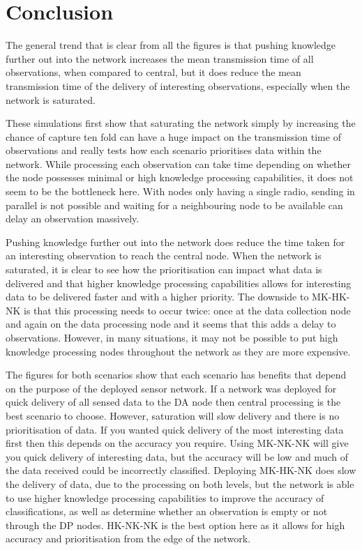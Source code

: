 \section{Conclusion}\label{sim:conc}
The general trend that is clear from all the figures is that pushing knowledge further out into the network increases the mean transmission time of all observations, when compared to central, but it does reduce the mean transmission time of the delivery of interesting observations, especially when the network is saturated.

These simulations first show that saturating the network simply by increasing the chance of capture ten fold can have a huge impact on the transmission time of observations and really tests how each scenario prioritises data within the network. While processing each observation can take time depending on whether the node possesses minimal or high knowledge processing capabilities, it does not seem to be the bottleneck here. With nodes only having a single radio, sending in parallel is not possible and waiting for a neighbouring node to be available can delay an observation massively.

Pushing knowledge further out into the network does reduce the time taken for an interesting observation to reach the central node. When the network is saturated, it is clear to see how the prioritisation can impact what data is delivered and that higher knowledge processing capabilities allows for interesting data to be delivered faster and with a higher priority. The downside to MK-HK-NK is that this processing needs to occur twice: once at the data collection node and again on the data processing node and it seems that this adds a delay to observations. However, in many situations, it may not be possible to put high knowledge processing nodes throughout the network as they are more expensive.

The figures for both scenarios show that each scenario has benefits that depend on the purpose of the deployed sensor network. If a network was deployed for quick delivery of all sensed data to the DA node then central processing is the best scenario to choose. However, saturation will slow delivery and there is no prioritisation of data. If you wanted quick delivery of the most interesting data first then this depends on the accuracy you require. Using MK-NK-NK will give you quick delivery of interesting data, but the accuracy will be low and much of the data received could be incorrectly classified. Deploying MK-HK-NK does slow the delivery of data, due to the processing on both levels, but the network is able to use higher knowledge processing capabilities to improve the accuracy of classifications, as well as determine whether an observation is empty or not through the DP nodes. HK-NK-NK is the best option here as it allows for high accuracy and prioritisation from the edge of the network.



